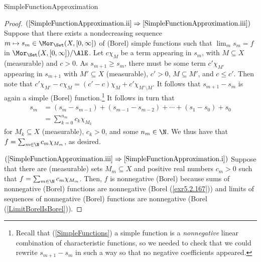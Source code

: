 \begin{prp}{}{SimpleFunctionApproximation}
\begin{proof}
\blankline
\noindent
$(\cref{SimpleFunctionApproximation.ii}\Rightarrow \cref{SimpleFunctionApproximation.iii})$ Suppose that there exists a nondecreasing sequence $m\mapsto s_m\in \Mor _{\Set}(X,[0,\infty ])$ of (Borel) simple functions such that $\lim _ms_m=f$ in $\Mor _{\Set}(X,[0,\infty ])/\AlE$.  Let $c\chi _M$ be a term appearing in $s_m$, with $M\subseteq X$ (measurable) and $c>0$.  As $s_{m+1}\geq s_m$, there must be some term $c'\chi _{M'}$ appearing in $s_{m+1}$ with $M'\subseteq X$ (measurable), $c'>0$, $M\subseteq M'$, and $c\leq c'$.  Then note that $c'\chi _{M'}-c\chi _M=(c'-c)\chi _M+c'\chi _{M'\setminus M}$.  It follows that $s_{m+1}-s_m$ is again a simple (Borel) function.\footnote{Recall that (\cref{SimpleFunctions}) a simple function is a \emph{nonnegative} linear combination of characteristic functions, so we needed to check that we could rewrite $s_{m+1}-s_m$ in such a way so that no negative coefficients appeared.}  It follows in turn that
\begin{equation}
\begin{split}
s_m & =(s_m-s_{m-1})+(s_{m-1}-s_{m-2})+\cdots +(s_1-s_0)+s_0 \\
& =\sum _{k=0}^{n_m}c_k\chi _{M_k}
\end{split}
\end{equation}
for $M_k\subseteq X$ (measurable), $c_k>0$, and some $n_m\in \N$.  We thus have that $f=\sum _{m\in \N}c_m\chi _{M_m}$, as desired.

\blankline
\noindent
$(\cref{SimpleFunctionApproximation.iii}\Rightarrow \cref{SimpleFunctionApproximation.i})$ Suppose that there are (measurable) sets $M_m\subseteq X$ and positive real numbers $c_m>0$ such that $f=\sum _{m\in \N}c_m\chi _{M_m}$.  Then, $f$ is nonnegative (Borel) because sums of nonnegative (Borel) functions are nonnegative (Borel (\cref{exr5.2.167})) and limits of sequences of nonnegative (Borel) functions are nonnegative (Borel (\cref{LimitBorelIsBorel})).
\end{proof}
\end{prp}

